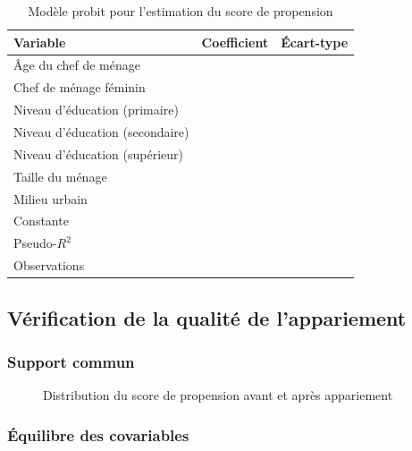 \begin{table}[H]
  \centering
  \caption{Modèle probit pour l'estimation du score de propension}
  \label{tab:probit}
  \begin{tabular}{lcc}
    \toprule
    Variable & Coefficient & Écart-type \\
    \midrule
    Âge du chef de ménage       & & \\
    Chef de ménage féminin      & & \\
    Niveau d'éducation (primaire) & & \\
    Niveau d'éducation (secondaire) & & \\
    Niveau d'éducation (supérieur) & & \\
    Taille du ménage            & & \\
    Milieu urbain               & & \\
    \midrule
    Constante                   & & \\
    \midrule
    Pseudo-$R^2$                & \multicolumn{2}{c}{} \\
    Observations                & \multicolumn{2}{c}{} \\
    \bottomrule
  \end{tabular}
\end{table}

\subsection{Vérification de la qualité de l'appariement}

\subsubsection{Support commun}

\begin{figure}[H]
  \centering
  \caption{Distribution du score de propension avant et après appariement}
  \label{fig:support}
\end{figure}

\subsubsection{Équilibre des covariables}

